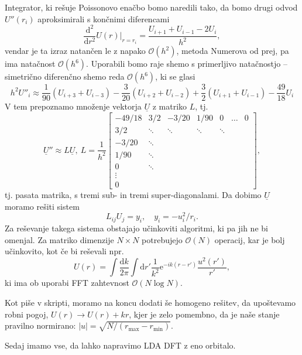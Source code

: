 \documentclass[12pt, a4 paper]{article}
\renewcommand{\d}{
	\ensuremath{\mathrm{d}}
}
\newcommand{\e}{
	\ensuremath{\mathrm{e}}
}
\begin{document}
Integrator, ki re\v suje Poissonovo ena\v cbo bomo naredili tako, da bomo drugi odvod $U''(r_i)$
aproksimirali s kon\v cnimi diferencami
\[
	\frac{\d^2}{\d r^2} U(r)\Big|_{r = r_i} = \frac{U_{i+1} + U_{i-1} - 2U_i}{h^2},
\]
vendar je ta izraz natan\v cen le z napako $\mathcal{O}(h^2)$, metoda Numerova od prej, pa ima nata\v cnost
$\mathcal{O}(h^6)$. Uporabili bomo raje shemo s primerljivo nata\v cnostjo -- simetri\v cno diferen\v cno shemo reda
$\mathcal{O} (h^6)$, ki se glasi
\begin{equation}
	h^2 U''_i \approx \frac{1}{90}(U_{i+3} + U_{i-3}) - \frac{3}{20} (U_{i+2} + U_{i-2}) + \frac{3}{2}(U_{i+1}
		+ U_{i-1}) - \frac{49}{18}U_i
\end{equation}
V tem prepoznamo mno\v zenje vektorja $\underline{U}$ z matriko $L$, tj.
\begin{equation}
	\underline{U}'' \approx L\underline{U},\ L = \frac{1}{h^2}\begin{bmatrix}
		-49/18 & 3/2 & -3/20 & 1/90 & 0 & \ldots & 0 \\
		3/2 & \ddots & \ddots & \ddots & \ddots & \\
		-3/20 & \ddots & & & & \\
		1/90 & \ddots & & & & \\
		0 & \ddots & & & & \\
		\vdots & & & & & \\
		0 & & & & &
		\end{bmatrix},
\end{equation}
tj. pasata matrika, s tremi sub- in tremi super-diagonalami. Da dobimo $\underline{U}$ moramo re\v siti sistem
\begin{equation}
	L_{ij} U_j = y_i,\quad y_i = -u_i^2/r_i.
\end{equation}
Za re\v sevanje takega sistema obstajajo u\v cinkoviti algoritmi, ki pa jih ne bi omenjal. Za matriko dimenzije
$N\times N$ potrebujejo $\mathcal{O}(N)$ operacij, kar je bolj u\v cinkovito, kot \v ce bi re\v sevali npr.
\[
	U(r) = \int \frac{\d k}{2\pi} \int \d r' \frac{1}{k^2} \e^{-ik(r - r')} \frac{u^2(r')}{r'},
\]
ki ima ob uporabi FFT zahtevnost $\mathcal{O}(N\log N)$.

Kot pi\v se v skripti, moramo na koncu dodati \v se homogeno re\v sitev, da upo\v stevamo robni pogoj, $U(r) \to U(r) + kr$,
kjer je zelo pomembno, da je na\v se stanje pravilno normirano: $|u| = \sqrt{N/(r_\text{max} - r_\text{min})}$.

Sedaj imamo vse, da lahko napravimo LDA DFT z eno orbitalo.
\end{document}
